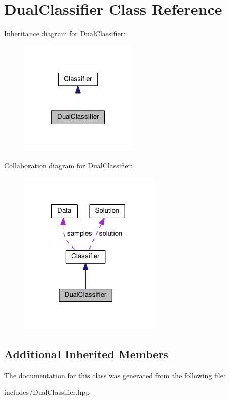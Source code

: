\hypertarget{class_dual_classifier}{}\section{Dual\+Classifier Class Reference}
\label{class_dual_classifier}


Inheritance diagram for Dual\+Classifier\+:\nopagebreak
\begin{figure}[H]
\begin{center}
\leavevmode
\includegraphics[width=158pt]{class_dual_classifier__inherit__graph}
\end{center}
\end{figure}


Collaboration diagram for Dual\+Classifier\+:
\nopagebreak
\begin{figure}[H]
\begin{center}
\leavevmode
\includegraphics[width=188pt]{class_dual_classifier__coll__graph}
\end{center}
\end{figure}
\subsection*{Additional Inherited Members}


The documentation for this class was generated from the following file\+:\begin{DoxyCompactItemize}
\item 
includes/Dual\+Classifier.\+hpp\end{DoxyCompactItemize}
